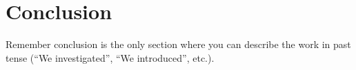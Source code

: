 \section{Conclusion}


Remember conclusion is the only section where you
can describe the work in past tense 
(``We investigated'',
``We introduced'', 
etc.).
